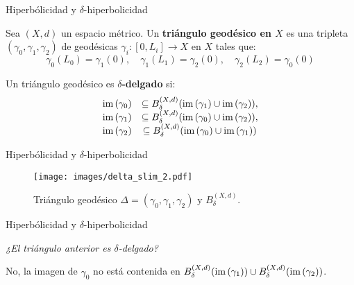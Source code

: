\documentclass[xcolor=dvipsnames]{beamer}
\theoremstyle{largebreak}
\newcommand\cf[3]{\ensuremath{#1:#2\rightarrow#3}}
\newcommand{\im}[1]{\ensuremath{\textup{im}\left(#1\right)}}
\begin{document}
\begin{frame}{Hiperbólicidad y $\delta$-hiperbolicidad}
    \begin{mydef}
        Sea $(X,d)$ un espacio métrico. Un \textbf{triángulo geodésico en $X$} es una tripleta $(\gamma_0,\gamma_1,\gamma_2)$ de geodésicas $\cf{\gamma_i}{[0,L_i]}{X}$ en $X$ tales que:
        \begin{equation*}
            \gamma_0(L_0)=\gamma_1(0),\quad \gamma_1(L_1)=\gamma_2(0),\quad \gamma_2(L_2)=\gamma_0(0)
        \end{equation*}
    \end{mydef}

    \begin{mydef}
        Un triángulo geodésico es \textbf{$\delta$-delgado} si:
        \begin{equation*}
            \begin{array}{cc}
                \im{\gamma_0}&\subseteq B_{\delta}^{(X,d)}(\im{\gamma_1}\cup\im{\gamma_2}),\\
                \im{\gamma_1}&\subseteq B_{\delta}^{(X,d)}(\im{\gamma_0}\cup\im{\gamma_2}),\\
                \im{\gamma_2}&\subseteq B_{\delta}^{(X,d)}(\im{\gamma_0}\cup\im{\gamma_1})
            \end{array}
        \end{equation*}
    \end{mydef}
\end{frame}

\begin{frame}{Hiperbólicidad y $\delta$-hiperbolicidad}
    \begin{figure}
        \begin{center}
            \texttt{[image: images/delta\_slim\_2.pdf]}
        \end{center}
        \caption{Triángulo geodésico $\Delta=(\gamma_0,\gamma_1,\gamma_2)$ y $B_\delta^{(X,d)}$.}
    \end{figure}
\end{frame}

\begin{frame}{Hiperbólicidad y $\delta$-hiperbolicidad}
    \begin{center}
        \textit{\Large ¿El triángulo anterior es $\delta$-delgado?}
    \end{center}
    \pause
    \begin{center}
        \Large No, la imagen de $\gamma_0$ no está contenida en $B_\delta^{(X,d)}(\im{\gamma_1})\cup B_\delta^{(X,d)}(\im{\gamma_2})$.
    \end{center}
\end{frame}
\end{document}
